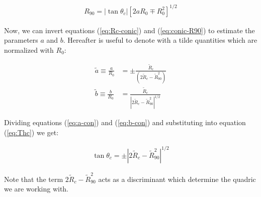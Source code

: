 \begin{align}
R_{90} = \left|\tan\theta_c\right|\left[2aR_0\mp R_0^2\right]^{1/2}\label{eq:conic-R90}
\end{align}


Now, we can invert equations (\ref{eq:Rc-conic}) and (\ref{eq:conic-R90}) to estimate the parameters $a$ and $b$.
Hereafter is useful to denote with a tilde quantities which are normalized with $R_0$:


\begin{align}
  \tilde{a}\equiv \frac{a}{R_0} &= \pm\frac{\tilde{R}_c}{\left(2\tilde{R}_c-\tilde{R}_{90}^2\right)} \label{eq:a-con}\\
  \tilde{b}\equiv \frac{b}{R_0} &= \frac{\tilde{R}_c}{\left|2\tilde{R}_c-\tilde{R}_{90}^2\right|^{1/2}} \label{eq:b-con}
\end{align}


Dividing equations (\ref{eq:a-con}) and (\ref{eq:b-con}) and substituting into equation (\ref{eq:Thc}) we get:

\begin{align}
\tan\theta_c = \pm \left|2\tilde{R}_c-\tilde{R}_{90}^2\right|^{1/2} \label{eq:th_c}
\end{align}

Note that the term $2\tilde{R}_c-\tilde{R}_{90}^2$ acts as a discriminant which determine the quadric we are working with.


